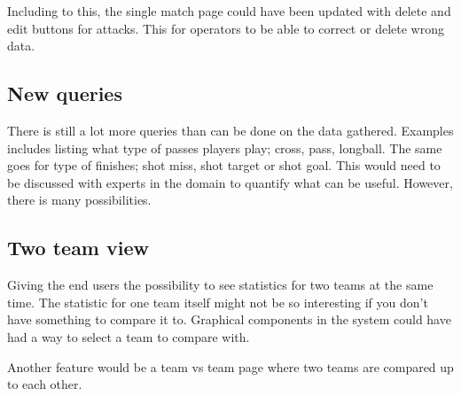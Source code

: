Including to this, the single match page could have been updated with delete and edit buttons for attacks. This for operators to be able to correct or delete wrong data.

\subsection{New queries}

There is still a lot more queries than can be done on the data gathered. Examples includes listing what type of passes players play; cross, pass, longball. The same goes for type of finishes; shot miss, shot target or shot goal. This would need to be discussed with experts in the domain to quantify what can be useful. However, there is many possibilities. 

\subsection{Two team view}

Giving the end users the possibility to see statistics for two teams at the same time. The statistic for one team itself might not be so interesting if you don't have something to compare it to.  Graphical components in the system could have had a way to select a team to compare with.

Another feature would be a team vs team page where two teams are compared up to each other.

